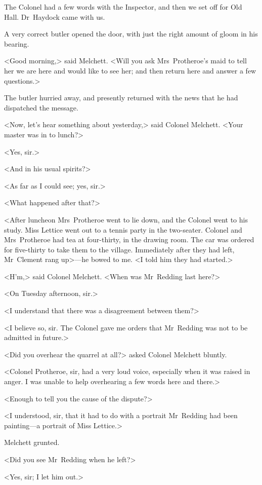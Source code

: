The Colonel had a few words with the Inspector, and then we set off for Old Hall. Dr~Haydock came with us.

A very correct butler opened the door, with just the right amount of gloom in his bearing.

<Good morning,> said Melchett. <Will you ask Mrs~Protheroe's maid to tell her we are here and would like to see her; and then return here and answer a few questions.>

The butler hurried away, and presently returned with the news that he had dispatched the message.

<Now, let's hear something about yesterday,> said Colonel Melchett. <Your master was in to lunch?>

<Yes, sir.>

<And in his usual spirits?>

<As far as I could see; yes, sir.>

<What happened after that?>

<After luncheon Mrs~Protheroe went to lie down, and the Colonel went to his study. Miss Lettice went out to a tennis party in the two-seater. Colonel and Mrs~Protheroe had tea at four-thirty, in the drawing room. The car was ordered for five-thirty to take them to the village. Immediately after they had left, Mr~Clement rang up>—he bowed to me. <I told him they had started.>

<H'm,> said Colonel Melchett. <When was Mr~Redding last here?>

<On Tuesday afternoon, sir.>

<I understand that there was a disagreement between them?>

<I believe so, sir. The Colonel gave me orders that Mr~Redding was not to be admitted in future.>

<Did you overhear the quarrel at all?> asked Colonel Melchett bluntly.

<Colonel Protheroe, sir, had a very loud voice, especially when it was raised in anger. I was unable to help overhearing a few words here and there.>

<Enough to tell you the cause of the dispute?>

<I understood, sir, that it had to do with a portrait Mr~Redding had been painting—a portrait of Miss Lettice.>

Melchett grunted.

<Did you see Mr~Redding when he left?>

<Yes, sir; I let him out.>

